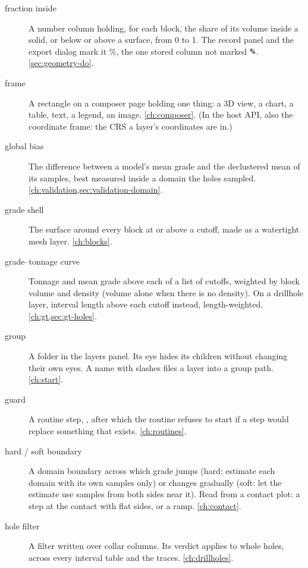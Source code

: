 \begin{description}
\item[fraction inside] A number column holding, for each block, the share of its volume inside a
  solid, or below or above a surface, from 0 to 1. The record panel and the export dialog mark it
  \%, the one stored column not marked ✎. \cref{sec:geometry-do}.

\item[frame] A rectangle on a composer page holding one thing: a 3D view, a chart, a table, text, a
  legend, an image. \cref{ch:composer}. (In the host API, also the coordinate frame: the CRS a
  layer's coordinates are in.)

\item[global bias] The difference between a model's mean grade and the declustered mean of its
  samples, best measured inside a domain the holes sampled. \cref{ch:validation,sec:validation-domain}.

\item[grade shell] The surface around every block at or above a cutoff, made as a watertight mesh
  layer. \cref{ch:blocks}.

\item[grade–tonnage curve] Tonnage and mean grade above each of a list of cutoffs, weighted by
  block volume and density (volume alone when there is no density). On a drillhole layer, interval
  length above each cutoff instead, length-weighted. \cref{ch:gt,sec:gt-holes}.

\item[group] A folder in the layers panel. Its eye hides its children without changing their own
  eyes. A name with slashes files a layer into a group path. \cref{ch:start}.

\item[guard] A routine step, , after which the routine refuses to
  start if a step would replace something that exists. \cref{ch:routines}.

\item[hard / soft boundary] A domain boundary across which grade jumps (hard: estimate each domain
  with its own samples only) or changes gradually (soft: let the estimate use samples from both
  sides near it). Read from a contact plot: a step at the contact with flat sides, or a ramp.
  \cref{ch:contact}.

\item[hole filter] A filter written over collar columns. Its verdict applies to whole holes, across
  every interval table and the traces. \cref{ch:drillholes}.


\end{description}
